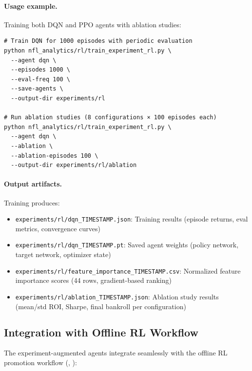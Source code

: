 \paragraph{Usage example.}
Training both DQN and PPO agents with ablation studies:
\begin{verbatim}
# Train DQN for 1000 episodes with periodic evaluation
python nfl_analytics/rl/train_experiment_rl.py \
  --agent dqn \
  --episodes 1000 \
  --eval-freq 100 \
  --save-agents \
  --output-dir experiments/rl

# Run ablation studies (8 configurations × 100 episodes each)
python nfl_analytics/rl/train_experiment_rl.py \
  --agent dqn \
  --ablation \
  --ablation-episodes 100 \
  --output-dir experiments/rl/ablation
\end{verbatim}

\paragraph{Output artifacts.}
Training produces:
\begin{itemize}
  \item \texttt{experiments/rl/dqn\_TIMESTAMP.json}: Training results (episode returns, eval metrics, convergence curves)
  \item \texttt{experiments/rl/dqn\_TIMESTAMP.pt}: Saved agent weights (policy network, target network, optimizer state)
  \item \texttt{experiments/rl/feature\_importance\_TIMESTAMP.csv}: Normalized feature importance scores (44 rows, gradient-based ranking)
  \item \texttt{experiments/rl/ablation\_TIMESTAMP.json}: Ablation study results (mean/std ROI, Sharpe, final bankroll per configuration)
\end{itemize}

\subsection{Integration with Offline RL Workflow}

The experiment-augmented agents integrate seamlessly with the offline RL promotion workflow (, ):

